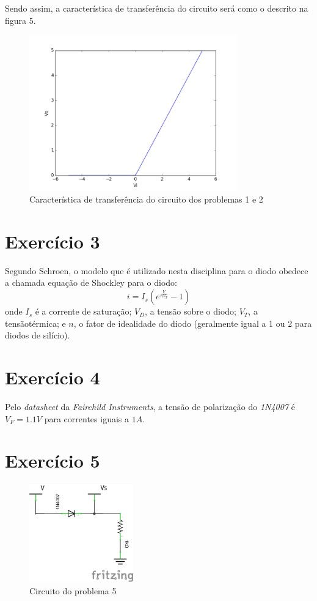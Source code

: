 \documentclass[12pt, a4paper, twoside]{article}
\begin{document}
Sendo assim, a característica de transferência do circuito será como o descrito na
figura 5.

\begin{figure}[H]
    \centering
    \includegraphics[width=0.8\textwidth]{figs/rel3/ex2.png}
    \caption{Característica de transferência do circuito dos problemas 1 e 2}
\end{figure}

\section{Exercício 3}

Segundo Schroen, o modelo que é utilizado nesta disciplina para o diodo obedece a
chamada equação de Shockley para o diodo:
$$i = I_s\left( e^{\frac{V}{nV_T}} - 1 \right)$$
onde $I_s$ é a corrente de saturação;
$V_D$, a tensão sobre o diodo;
$V_T$, a tensãotérmica; e
$n$, o fator de idealidade do diodo (geralmente igual a 1 ou 2 para diodos
de silício).

\section{Exercício 4}

Pelo \textit{datasheet} da \textit{Fairchild Instruments}, a tensão de polarização
do \textit{1N4007} é $V_F = 1.1V$ para correntes iguais a $1A$.

\section{Exercício 5}

\begin{figure}[H]
    \centering
    \includegraphics[width=0.4\textwidth]{figs/rel3/c2.png}
    \caption{Circuito do problema 5}
\end{figure}
\end{document}
